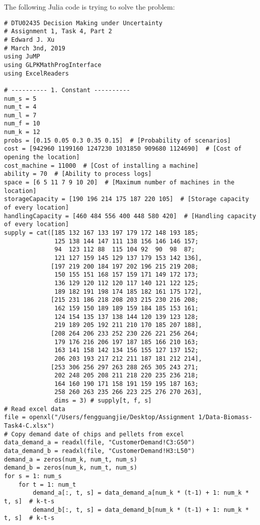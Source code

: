 \documentclass[fleqn,10pt]{wlscirep}
\begin{document}
The following Julia code is trying to solve the problem:
\begin{lstlisting}
# DTU02435 Decision Making under Uncertainty
# Assignment 1, Task 4, Part 2
# Edward J. Xu
# March 3nd, 2019
using JuMP
using GLPKMathProgInterface
using ExcelReaders

# ---------- 1. Constant ----------
num_s = 5
num_t = 4
num_l = 7
num_f = 10
num_k = 12
probs = [0.15 0.05 0.3 0.35 0.15]  # [Probability of scenarios]
cost = [942960 1199160 1247230 1031850 909680 1124690]  # [Cost of opening the location]
cost_machine = 11000  # [Cost of installing a machine]
ability = 70  # [Ability to process logs]
space = [6 5 11 7 9 10 20]  # [Maximum number of machines in the location]
storageCapacity = [190 196 214 175 187 220 105]  # [Storage capacity of every location]
handlingCapacity = [460 484 556 400 448 580 420]  # [Handling capacity of every location]
supply = cat([185 132 167 133 197 179 172 148 193 185;
              125 138 144 147 111 138 156 146 146 157;
              94  123 112 88  115 104 92  90  98  87;
              121 127 159 145 129 137 179 153 142 136],
             [197 219 200 184 197 202 196 215 219 208;
              150 155 151 168 157 159 171 149 172 173;
              136 129 120 112 120 117 140 121 122 125;
              189 182 191 198 174 185 182 161 175 172],
             [215 231 186 218 208 203 215 230 216 208;
              162 159 150 189 189 159 184 185 153 161;
              124 154 135 137 138 144 120 139 123 128;
              219 189 205 192 211 210 170 185 207 188],
             [208 264 206 233 252 230 226 221 256 264;
              179 176 216 206 197 187 185 166 210 163;
              163 141 158 142 134 156 155 127 137 152;
              206 203 193 217 212 211 187 181 212 214],
             [253 306 256 297 263 288 265 305 243 271;
              202 248 205 208 211 218 220 235 236 218;
              164 160 190 171 158 191 159 195 187 163;
              258 260 263 235 266 223 225 276 270 263],
              dims = 3) # supply[t, f, s]
# Read excel data
file = openxl("/Users/fengguangjie/Desktop/Assignment 1/Data-Biomass-Task4-C.xlsx")
# Copy demand date of chips and pellets from excel
data_demand_a = readxl(file, "CustomerDemand!C3:G50")
data_demand_b = readxl(file, "CustomerDemand!H3:L50")
demand_a = zeros(num_k, num_t, num_s)
demand_b = zeros(num_k, num_t, num_s)
for s = 1: num_s
    for t = 1: num_t
        demand_a[:, t, s] = data_demand_a[num_k * (t-1) + 1: num_k * t, s]  # k-t-s
        demand_b[:, t, s] = data_demand_b[num_k * (t-1) + 1: num_k * t, s]  # k-t-s

\end{lstlisting}
\end{document}
